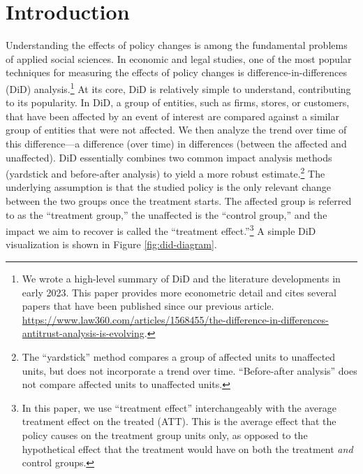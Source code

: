 \documentclass[12pt]{article}
\begin{document}
\tableofcontents

\doublespacing

\newpage
\section{Introduction} \label{sec:introduction}
Understanding the effects of policy changes is among the fundamental problems of applied social sciences. In economic and legal studies, one of the most popular techniques for measuring the effects of policy changes is difference-in-differences (DiD) analysis.\footnote{We wrote a high-level summary of DiD and the literature developments in early 2023. This paper provides more econometric detail and cites several papers that have been published since our previous article. \url{https://www.law360.com/articles/1568455/the-difference-in-differences-antitrust-analysis-is-evolving}.}  At its core, DiD is relatively simple to understand, contributing to its popularity. In DiD, a group of entities, such as firms, stores, or customers, that have been affected by an event of interest are compared against a similar group of entities that were not affected. We then analyze the trend over time of this difference---a difference (over time) in differences (between the affected and unaffected). DiD essentially combines two common impact analysis methods (yardstick and before-after analysis) to yield a more robust estimate.\footnote{The ``yardstick'' method compares a group of affected units to unaffected units, but does not incorporate a trend over time. ``Before-after analysis'' does not compare affected units to unaffected units.} The underlying assumption is that the studied policy is the only relevant change between the two groups once the treatment starts. The affected group is referred to as the “treatment group,” the unaffected is the “control group,” and the impact we aim to recover is called the ``treatment effect.''\footnote{In this paper, we use ``treatment effect'' interchangeably with the average treatment effect on the treated (ATT). This is the average effect that the policy causes on the treatment group units only, as opposed to the hypothetical effect that the treatment would have on both the treatment \textit{and} control groups.} A simple DiD visualization is shown in Figure \ref{fig:did-diagram}.
\end{document}
